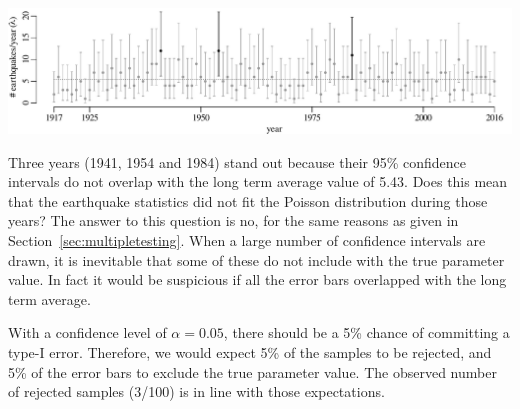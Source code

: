 \noindent\includegraphics[width=\textwidth]{../figures/poiserrbars.pdf}
\begingroup {}
\endgroup

Three years (1941, 1954 and 1984) stand out because their 95\%
confidence intervals do not overlap with the long term average value
of 5.43. Does this mean that the earthquake statistics did not fit the
Poisson distribution during those years? The answer to this question
is no, for the same reasons as given in
Section~\ref{sec:multipletesting}. When a large number of confidence
intervals are drawn, it is inevitable that some of these do not
include with the true parameter value. In fact it would be suspicious
if all the error bars overlapped with the long term average.\medskip

With a confidence level of $\alpha=0.05$, there should be a 5\%
chance of committing a type-I error.  Therefore, we would expect 5\%
of the samples to be rejected, and 5\% of the error bars to exclude
the true parameter value. The observed number of rejected samples
(3/100) is in line with those expectations.
